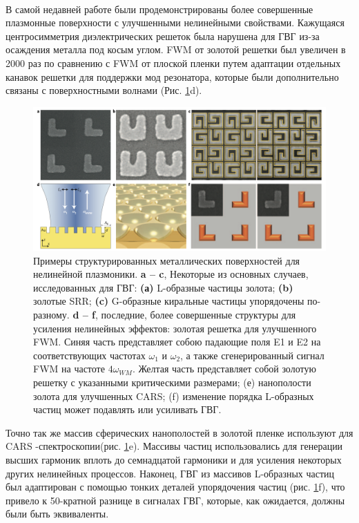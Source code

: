 \\
\hspace*{2mm}
В самой недавней работе были продемонстрированы более совершенные плазмонные поверхности с улучшенными нелинейными свойствами. Кажущаяся центросимметрия диэлектрических решеток была нарушена для ГВГ из-за осаждения металла под косым углом. FWM от золотой решетки был увеличен в 2000 раз по сравнению с FWM от плоской пленки путем адаптации отдельных канавок решетки для поддержки мод резонатора, которые были дополнительно связаны с поверхностными волнами \cite{genevet2010large} (Рис. \ref{mettals}d). 
\begin{figure}[h!]
	\centering
	\includegraphics[width=0.9\linewidth]{images/mettals.png}
	\caption{Примеры структурированных металлических поверхностей для нелинейной плазмоники. \textbf{a – c}, Некоторые из основных случаев, исследованных для ГВГ: \textbf{(а)} L-образные частицы золота; \textbf{(b) }золотые SRR; \textbf{(c)} G-образные киральные частицы упорядочены по-разному. \textbf{d – f},  последние, более совершенные структуры для усиления нелинейных эффектов: золотая решетка для улучшенного FWM. Синяя часть представляет собою падающие поля E1 и E2 на соответствующих частотах $\omega_1$ и $\omega_2$, а также сгенерированный сигнал FWM на частоте $4\omega_{WM}$. Желтая часть представляет собой золотую решетку с указанными критическими размерами; (е) нанополости золота для улучшенных CARS; (f) изменение порядка L-образных частиц может подавлять или усиливать ГВГ.}
	\label{mettals}
\end{figure}
Точно так же массив сферических нанополостей в золотой пленке используют для CARS -спектроскопии(рис. \ref{mettals}e). Массивы частиц использовались для генерации высших гармоник вплоть до семнадцатой гармоники \cite{kim2008high} и для усиления некоторых других нелинейных процессов. Наконец, ГВГ из массивов L-образных частиц был адаптирован с помощью тонких деталей упорядочения частиц (рис. \ref{mettals}f), что привело к 50-кратной разнице в сигналах ГВГ, которые, как ожидается, должны были быть эквиваленты.

